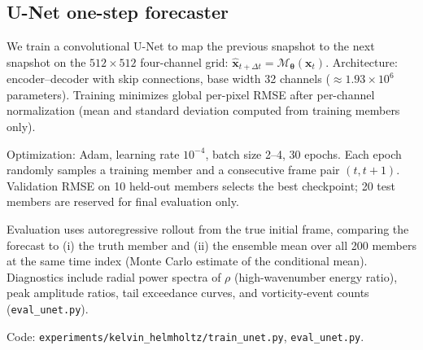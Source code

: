 
\subsection{U-Net one-step forecaster}
\label{subsec:unet_methods}

We train a convolutional U-Net to map the previous snapshot to the next snapshot on the $512\times512$ four-channel grid:
$\hat{\mathbf{x}}_{t+\Delta t}=\mathcal{M}_{\boldsymbol{\theta}}(\mathbf{x}_t)$.
Architecture: encoder--decoder with skip connections, base width 32 channels ($\approx 1.93\times10^6$ parameters).
Training minimizes global per-pixel RMSE after per-channel normalization (mean and standard deviation computed from training members only).

Optimization: Adam, learning rate $10^{-4}$, batch size 2--4, 30 epochs.
Each epoch randomly samples a training member and a consecutive frame pair $(t,t+1)$.
Validation RMSE on 10 held-out members selects the best checkpoint; 20 test members are reserved for final evaluation only.

Evaluation uses autoregressive rollout from the true initial frame, comparing the forecast to (i) the truth member and (ii) the ensemble mean over all 200 members at the same time index (Monte Carlo estimate of the conditional mean).
Diagnostics include radial power spectra of $\rho$ (high-wavenumber energy ratio), peak amplitude ratios, tail exceedance curves, and vorticity-event counts (\texttt{eval\_unet.py}).

Code: \texttt{experiments/kelvin\_helmholtz/train\_unet.py}, \texttt{eval\_unet.py}.
